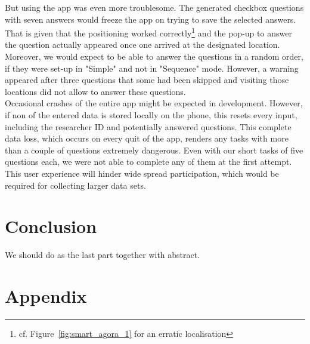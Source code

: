 \documentclass[letterpaper]{article}
\begin{document}
\indent But using the app was even more troublesome. The generated checkbox questions with seven answers would freeze the app on trying to save the selected answers. That is given that the positioning worked correctly\footnote{cf. Figure~\ref{fig:smart_agora_1} for an erratic localisation} and the pop-up to answer the question actually appeared once one arrived at the designated location. Moreover, we would expect to be able to answer the questions in a random order, if they were set-up in "Simple" and not in "Sequence" mode. However, a warning appeared after three questions that some had been skipped and visiting those locations did not allow to answer these questions.\\
\indent Occasional crashes of the entire app might be expected in development. However, if non of the entered data is stored locally on the phone, this resets every input, including the researcher ID and potentially answered questions. This complete data loss, which occurs on every quit of the app, renders any tasks with more than a couple of questions extremely dangerous. Even with our short tasks of five questions each, we were not able to complete any of them at the first attempt. This user experience will hinder wide spread participation, which would be required for collecting larger data sets.
\section{Conclusion}
We should do as the last part together with abstract.




\section{Appendix}
\end{document}
